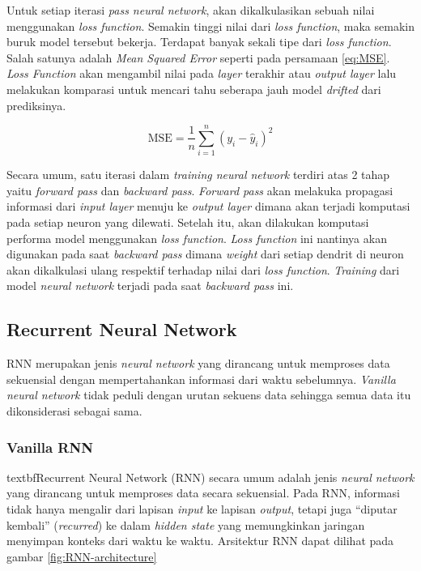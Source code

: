 Untuk setiap iterasi \textit{pass neural network}, akan dikalkulasikan sebuah nilai menggunakan \textit{loss function}. Semakin tinggi nilai dari \textit{loss function}, maka semakin buruk model tersebut bekerja. Terdapat banyak sekali tipe dari \textit{loss function}. Salah satunya adalah \textit{Mean Squared Error} seperti pada persamaan \ref{eq:MSE}. \textit{Loss Function} akan mengambil nilai pada \textit{layer} terakhir atau \textit{output layer} lalu melakukan komparasi untuk mencari tahu seberapa jauh model \textit{drifted} dari prediksinya.  

\begin{equationfloat}
\begin{equation}
\text{MSE} = \frac{1}{n} \sum_{i=1}^{n} (y_i - \hat{y}_i)^2
\end{equation}
\caption{\textit{Mean Squared Error}}
\label{eq:MSE}
\end{equationfloat}

Secara umum, satu iterasi dalam \textit{training neural network} terdiri atas 2 tahap yaitu \textit{forward pass} dan \textit{backward pass}. \textit{Forward pass} akan melakuka propagasi informasi dari \textit{input layer} menuju ke \textit{output layer} dimana akan terjadi komputasi pada setiap neuron yang dilewati. Setelah itu, akan dilakukan komputasi performa model menggunakan \textit{loss function}. \textit{Loss function} ini nantinya akan digunakan pada saat \textit{backward pass} dimana \textit{weight} dari setiap dendrit di neuron akan dikalkulasi ulang respektif terhadap nilai dari \textit{loss function}. \textit{Training} dari model \textit{neural network} terjadi pada saat \textit{backward pass} ini. 

\subsection{Recurrent Neural Network}
RNN merupakan jenis \textit{neural network} yang dirancang untuk memproses data sekuensial dengan mempertahankan informasi dari waktu sebelumnya. \textit{Vanilla neural network} tidak peduli dengan urutan sekuens data sehingga semua data itu dikonsiderasi sebagai sama.

\subsubsection{Vanilla RNN}
textbf{Recurrent Neural Network (RNN)} secara umum adalah jenis \textit{neural network} yang dirancang untuk memproses data secara sekuensial. Pada RNN, informasi tidak hanya mengalir dari lapisan \textit{input} ke lapisan \textit{output}, tetapi juga “diputar kembali” (\textit{recurred}) ke dalam \textit{hidden state} yang memungkinkan jaringan menyimpan konteks dari waktu ke waktu. Arsitektur RNN dapat dilihat pada gambar \ref{fig:RNN-architecture}

